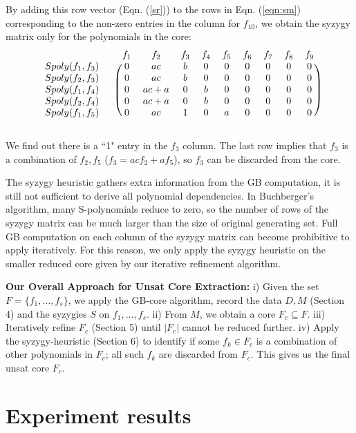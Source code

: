 \begin{Example}
 By adding this row vector (Eqn. (\ref{sr})) to the rows in
 Eqn. (\ref{eqn:sm}) corresponding to the non-zero entries in the
 column for $f_{10}$, we obtain the syzygy matrix only for the
 polynomials in the core:
  \[
 \begin{blockarray}{ccccccccccc}
  && f_1 & f_2 & f_3 & f_4 & f_5 & f_6 & f_7 & f_8 & f_9  \\
  \begin{block}{cc(ccccccccc)}
  Spoly(f_1,f_3)\ & & 0 & ac & b &0&0&0&0&0&0\\
  Spoly(f_2,f_3)\  && 0 & ac & b &0&0&0&0&0&0\\
  Spoly(f_1,f_4)\  && 0 & ac+a & 0 &b&0&0&0&0&0\\
  Spoly(f_2,f_4)\  && 0 & ac+a & 0 &b&0&0&0&0&0\\
  Spoly(f_1,f_5)\  && 0 & ac & 1 &0&a&0&0&0&0\\
  \end{block}
  \end{blockarray}
 \]

 We find out there is a ``1" entry in the $f_3$ column. The last row
 implies that $f_3$ is a combination of $f_2, f_5$ ($f_3 = ac f_2 + a
 f_5$), so $f_3$ can be discarded from the core. 

 \end{Example}

The syzygy heuristic gathers extra information from the GB
computation, it is still not sufficient to derive all polynomial
dependencies. In Buchberger's algorithm,  many S-polynomials reduce to
zero, so the number of rows of the syzygy matrix can be much larger than
the size of original generating set. Full GB computation on each
column of the syzygy matrix can become prohibitive to apply
iteratively. For this reason, we only apply the syzygy heuristic
on the smaller reduced core given by our iterative refinement algorithm.

\textbf{Our Overall Approach for Unsat Core Extraction:} i) Given
the set $F = \{f_1,\dots,f_s\}$, we apply the GB-core algorithm,
record the data $D, M$ (Section 4) and the syzygies $S$ on
$f_1,\dots,f_s$. ii) From $M$, we obtain a core $F_c \subseteq
F$. iii) Iteratively refine $F_c$ (Section 5) until $|F_c|$ cannot be
reduced further. iv) Apply the syzygy-heuristic (Section 6) to
identify if some $f_k \in F_c$ is a combination of other polynomials
in $F_c$; all such $f_k$ are discarded from $F_c$. This gives us the
final unsat core $F_c$. 

\section{Experiment results}
\label{sec:exp}


